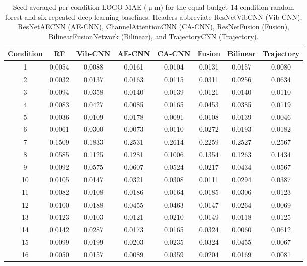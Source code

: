 \begin{table}[htbp]
\centering
\caption{Seed-averaged per-condition LOGO MAE ($\upmu$m) for the equal-budget 14-condition random forest and six repeated deep-learning baselines. Headers abbreviate ResNetVibCNN (Vib-CNN), ResNetAECNN (AE-CNN), ChannelAttentionCNN (CA-CNN), ResNetFusion (Fusion), BilinearFusionNetwork (Bilinear), and TrajectoryCNN (Trajectory).}
\label{tab:supp-seed-repeat-all}
\small
\setlength{\tabcolsep}{3.5pt}
\begin{tabular}{@{}cccccccc@{}}
\toprule
Condition & RF & Vib-CNN & AE-CNN & CA-CNN & Fusion & Bilinear & Trajectory \\ \midrule
1 & 0.0054 & 0.0088 & 0.0161 & 0.0104 & 0.0131 & 0.0157 & 0.0080 \\
2 & 0.0032 & 0.0137 & 0.0163 & 0.0115 & 0.0311 & 0.0256 & 0.0634 \\
3 & 0.0094 & 0.0358 & 0.0140 & 0.0139 & 0.0121 & 0.0140 & 0.0110 \\
4 & 0.0083 & 0.0427 & 0.0085 & 0.0165 & 0.0453 & 0.0385 & 0.0119 \\
5 & 0.0036 & 0.0109 & 0.0178 & 0.0091 & 0.0108 & 0.0139 & 0.0046 \\
6 & 0.0061 & 0.0300 & 0.0073 & 0.0110 & 0.0272 & 0.0193 & 0.0182 \\
7 & 0.1509 & 0.1833 & 0.2531 & 0.2614 & 0.2259 & 0.2527 & 0.2567 \\
8 & 0.0585 & 0.1125 & 0.1281 & 0.1006 & 0.1354 & 0.1263 & 0.1434 \\
9 & 0.0092 & 0.0575 & 0.0607 & 0.0524 & 0.0217 & 0.0434 & 0.0567 \\
10 & 0.0105 & 0.0147 & 0.0321 & 0.0308 & 0.0111 & 0.0294 & 0.0387 \\
11 & 0.0082 & 0.0108 & 0.0186 & 0.0164 & 0.0185 & 0.0306 & 0.0123 \\
12 & 0.0100 & 0.0188 & 0.0455 & 0.0463 & 0.0147 & 0.0264 & 0.0069 \\
13 & 0.0123 & 0.0103 & 0.0121 & 0.0210 & 0.0149 & 0.0118 & 0.0125 \\
14 & 0.0142 & 0.0287 & 0.0173 & 0.0165 & 0.0324 & 0.0060 & 0.0612 \\
15 & 0.0099 & 0.0199 & 0.0203 & 0.0235 & 0.0324 & 0.0455 & 0.0067 \\
16 & 0.0050 & 0.0157 & 0.0089 & 0.0359 & 0.0204 & 0.0169 & 0.0081 \\
\bottomrule
\end{tabular}
\end{table}
